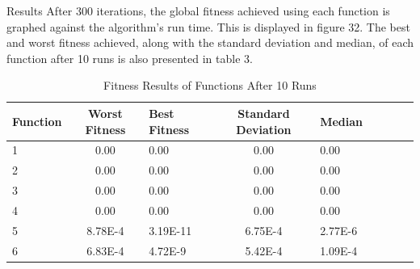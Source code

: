 \documentclass{beamer}
\begin{document}
\begin{frame}{Results}
After 300 iterations, the global fitness achieved using each function is graphed against the algorithm's run time. This is displayed in figure 32. The best and worst fitness achieved, along with the standard deviation and median, of each function after 10 runs is also presented in table 3.

\begin{table}[h!]
\centering
\begin{tabular}{l c l c l c l c l}
\hline
 Function & Worst Fitness       & Best Fitness        & Standard Deviation          & Median        \\
\hline
1   & 0.00 & 0.00 & 0.00 & 0.00 \\
\hline
2   & 0.00 & 0.00 & 0.00 & 0.00 \\
\hline
3  & 0.00 & 0.00 & 0.00 & 0.00 \\
\hline
4  & 0.00 & 0.00 & 0.00 & 0.00 \\
\hline
5  & 8.78E-4 & 3.19E-11 & 6.75E-4 & 2.77E-6 \\
\hline
6  & 6.83E-4 & 4.72E-9 & 5.42E-4 & 1.09E-4 \\
\hline
\end{tabular}
\caption{Fitness Results of Functions After 10 Runs}
\end{table}
\end{frame}
\end{document}
